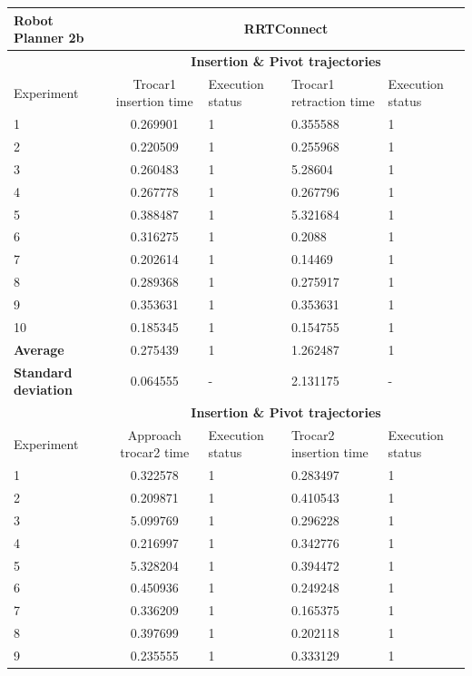 \begin{longtable}{|p{2cm}|c|p{2cm}|p{2cm}|p{2cm}|}
\hline
Robot Planner 2b           & \multicolumn{4}{c}{\textbf{RRTConnect}}                                                                                                 \vline \\
\hline
                          & \multicolumn{4}{c}{\textbf{Insertion \& Pivot trajectories}}                     \vline \\
\hline
Experiment                & Trocar1 insertion time & Execution status & Trocar1 retraction time & Execution status  \\
\hline
1	& 0.269901	& 1	& 0.355588	& 1 \\
2	& 0.220509	& 1	& 0.255968	& 1 \\
3	& 0.260483	& 1	& 5.28604	& 1 \\
4	& 0.267778	& 1	& 0.267796	& 1 \\
5	& 0.388487	& 1	& 5.321684	& 1 \\
6	& 0.316275	& 1	& 0.2088	& 1 \\
7	& 0.202614	& 1	& 0.14469	& 1 \\
8	& 0.289368	& 1	& 0.275917	& 1 \\
9	& 0.353631	& 1	& 0.353631	& 1 \\
10	& 0.185345	& 1	& 0.154755	& 1 \\
\hline
\textbf{Average} & 0.275439 &	1	& 1.262487	& 1 \\
\hline
\textbf{Standard deviation} & 	0.064555 &	- &	2.131175 & - \\
\hline
                          & \multicolumn{4}{c}{\textbf{Insertion \& Pivot trajectories}}                     \vline \\
\hline
Experiment                & Approach trocar2 time & Execution status & Trocar2 insertion time & Execution status  \\
\hline
1 & 0.322578	& 1	& 0.283497	& 1 \\
2 & 0.209871	& 1	& 0.410543	& 1 \\
3 & 5.099769	& 1	& 0.296228	& 1 \\
4 & 0.216997	& 1	& 0.342776	& 1 \\
5 & 5.328204	& 1	& 0.394472	& 1 \\
6 & 0.450936	& 1	& 0.249248	& 1 \\
7 & 0.336209	& 1	& 0.165375	& 1 \\
8 & 0.397699	& 1	& 0.202118	& 1 \\
9 & 0.235555	& 1	& 0.333129	& 1 \\

\end{longtable}
